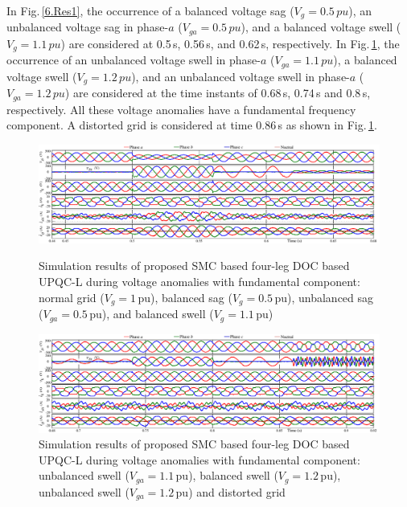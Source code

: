 In Fig.\,\ref{6.Res1}, the occurrence of a balanced voltage sag ($V_{g} = 0.5\, \si{pu}$), an unbalanced voltage sag in phase-$a$ ($V_{ga} = 0.5\, \si{pu}$), and a balanced voltage swell ($V_{g} = 1.1\, \si{pu}$) are considered at 0.5\,s, 0.56\,s, and 0.62\,s, respectively. In Fig.\,\ref{6.Res2}, the occurrence of an unbalanced voltage swell in phase-$a$ ($V_{ga} = 1.1\, \si{pu}$), a balanced voltage swell ($V_{g} = 1.2\, \si{pu}$), and an unbalanced voltage swell in phase-$a$ ($V_{ga} = 1.2\, \si{pu}$) are considered at the time instants of 0.68\,s, 0.74\,s and 0.8\,s, respectively. All these voltage anomalies have a fundamental frequency component. A distorted grid is considered at time 0.86\,s as shown in Fig.\,\ref{6.Res2}. 
\begin{figure}\centering
	\includegraphics[scale=0.72	]{figures/Chapter_6/Mine/Res1.pdf}
	\caption{Simulation results of proposed SMC based four-leg DOC based UPQC-L during voltage anomalies with fundamental component: normal grid ($V_g = 1\,$pu), balanced sag ($V_g = 0.5\,$pu), unbalanced sag ($V_{ga} = 0.5\,$pu), and balanced swell ($V_g = 1.1\,$pu)} 
	\label{6.Res1} \vspace*{0.5cm}
	\includegraphics[scale=0.72	]{figures/Chapter_6/Mine/Res2.pdf}
	\caption{Simulation results of proposed SMC based four-leg DOC based UPQC-L during voltage anomalies with fundamental component: unbalanced swell ($V_{ga} = 1.1\,$pu), balanced swell ($V_{g} = 1.2\,$pu), unbalanced swell ($V_{ga} = 1.2\,$pu) and distorted grid} 
	\label{6.Res2} 
\end{figure}
